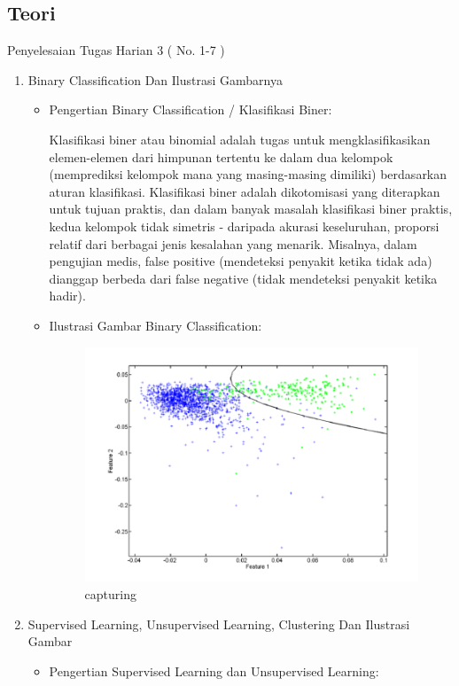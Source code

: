 \subsection{Teori}
Penyelesaian Tugas Harian 3 ( No. 1-7 )
\begin{enumerate}
\item Binary Classification Dan Ilustrasi Gambarnya
\begin{itemize}
\item Pengertian Binary Classification / Klasifikasi Biner:

Klasifikasi biner atau binomial adalah tugas untuk mengklasifikasikan elemen-elemen dari himpunan tertentu ke dalam dua kelompok (memprediksi kelompok mana yang masing-masing dimiliki) berdasarkan aturan klasifikasi. Klasifikasi biner adalah dikotomisasi yang diterapkan untuk tujuan praktis, dan dalam banyak masalah klasifikasi biner praktis, kedua kelompok tidak simetris - daripada akurasi keseluruhan, proporsi relatif dari berbagai jenis kesalahan yang menarik. Misalnya, dalam pengujian medis, false positive (mendeteksi penyakit ketika tidak ada) dianggap berbeda dari false negative (tidak mendeteksi penyakit ketika hadir).

\item Ilustrasi Gambar Binary Classification:

\begin{figure}[ht]
\centering
\includegraphics[scale=0.5]{figures/Chapter2-AnnisaFathoroni1.png}
\caption{capturing}
\label{contoh}
\end{figure}
\end{itemize}

\item Supervised Learning, Unsupervised Learning, Clustering Dan Ilustrasi Gambar
\begin{itemize}
\item Pengertian Supervised Learning dan Unsupervised Learning:


\end{itemize}
\end{enumerate}
